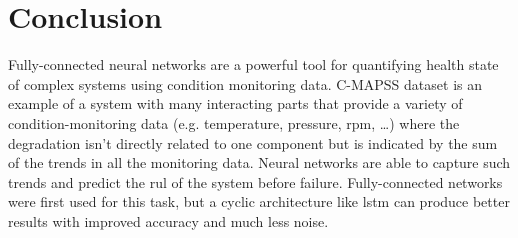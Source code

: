 \section{Conclusion}
Fully-connected neural networks are a powerful tool for quantifying health state of complex systems using condition monitoring data. C-MAPSS dataset is an example of a system with many interacting parts that provide a variety of condition-monitoring data (e.g. temperature, pressure, rpm, …) where the degradation isn't directly related to one component but is indicated by the sum of the trends in all the monitoring data. Neural networks are able to capture such trends and predict the \acrshort{rul} of the system before failure. Fully-connected networks were first used for this task, but a cyclic architecture like \acrshort{lstm} can produce better results with improved accuracy and much less noise.
